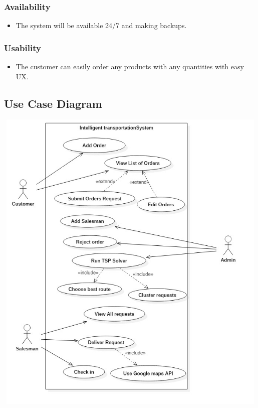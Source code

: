 \documentclass[12pt]{article}
\begin{document}
\subsubsection{ Availability }
\begin{itemize}
	\item The system will be available 24/7 and making backups.
\end{itemize}

\subsubsection{ Usability }
\begin{itemize}
	\item The customer can easily order any products with any quantities with easy UX.
\end{itemize}

\subsection{ Use Case Diagram }
\begin{center}
	\includegraphics[width=17cm,height=15cm]{./assets/usecase/use-case-diagram.png}\\
\end{center}
\end{document}
